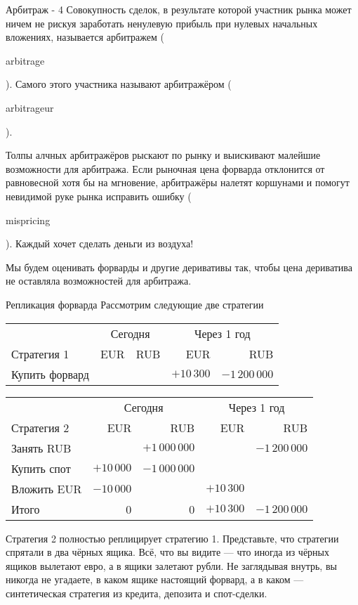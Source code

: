 \documentclass{beamer}
\newcommand{\en}[1]{\begin{otherlanguage}{english}#1\end{otherlanguage}}
\begin{document}
\begin{frame}{Арбитраж - 4}
\justify
Совокупность сделок, в результате которой участник рынка может ничем не рискуя заработать ненулевую прибыль при нулевых начальных вложениях, называется \alert{арбитражем} (\en{arbitrage}). Самого этого участника называют арбитражёром (\en{arbitrageur}).

\justify
Толпы алчных арбитражёров рыскают по рынку и выискивают малейшие возможности для арбитража. Если рыночная цена форварда отклонится от равновесной хотя бы на мгновение, арбитражёры налетят коршунами и помогут невидимой руке рынка исправить ошибку (\en{mispricing}). Каждый хочет сделать деньги из воздуха! 

\justify
Мы будем оценивать форварды и другие деривативы так, чтобы цена дериватива не оставляла возможностей для арбитража.
\end{frame}



\begin{frame}{Репликация форварда}
\justify
Рассмотрим следующие две стратегии

\justify
\small{
\begin{tabular}{l|r|r|r|r}
 & \multicolumn{2}{c|}{Сегодня} & \multicolumn{2}{c}{Через 1 год} \\ \cline{2-5}
Стратегия 1& EUR & RUB & EUR & RUB \\ \hline
Купить форвард&                              &                                & $+10\,300$ & $-1\,200\,000$
\end{tabular}
}

\justify
\small{
\begin{tabular}{l|r|r|r|r}
& \multicolumn{2}{c|}{Сегодня} & \multicolumn{2}{c}{Через 1 год} \\ \cline{2-5}
Стратегия 2 & EUR & RUB & EUR & RUB \\ \hline
Занять RUB &                             & $+1\,000\,000$ &                    & $-1\,200\,000$ \\
Купить спот        & $+10\,000$ & $-1\,000\,000$  &                     &                                  \\
Вложить EUR & $-10\,000$  &                                  & $+10\,300$ & \\  \hline
Итого & 0 & 0 &  $+10\,300$ & $-1\,200\,000$
\end{tabular}
}

\justify
Стратегия 2 полностью \alert{реплицирует} стратегию 1. Представьте, что стратегии спрятали в два чёрных ящика. Всё, что вы видите --- что иногда из чёрных ящиков вылетают евро, а в ящики залетают рубли. Не заглядывая внутрь, вы никогда не угадаете, в каком ящике настоящий форвард, а в каком --- синтетическая стратегия из кредита, депозита и спот-сделки.
\end{frame}
\end{document}
